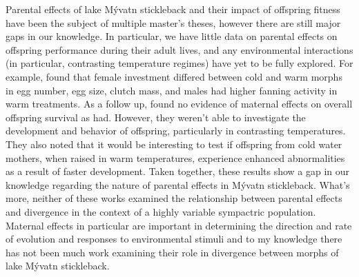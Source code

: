 \documentclass[12pt]{extarticle}
\begin{document}
Parental effects of lake M\'yvatn stickleback and their impact of offspring fitness have been the subject of multiple master's theses, however there are still major gaps in our knowledge. In particular, we have little data on parental effects on offspring performance during their adult lives, and any environmental interactions (in particular, contrasting temperature regimes) have yet to be fully explored. For example, \citet{Senn} found that female investment differed between cold and warm morphs in egg number, egg size, clutch mass, and males had higher fanning activity in warm treatments. As a follow up, \citet{Diethelm} found no evidence of maternal effects on overall offspring survival as \citet{Senn} had. However, they weren't able to investigate the development and behavior of offspring, particularly in contrasting temperatures. They also noted that it would be interesting to test if offspring from cold water mothers, when raised in warm temperatures, experience enhanced abnormalities as a result of faster development. Taken together, these results show a gap in our knowledge regarding the nature of parental effects in M\'yvatn stickleback. What's more, neither of these works examined the relationship between parental effects and divergence in the context of a highly variable sympactric population. Maternal effects in particular are important in determining the direction and rate of evolution \citep{AbGhani2012, Perry2005, Pfennig2009, Green2008} and responses to environmental stimuli \citep{Giesing2011, Green2008, Kozak2012a} and to my knowledge there has not been much work examining their role in divergence between morphs of lake M\'yvatn stickleback.
\end{document}
